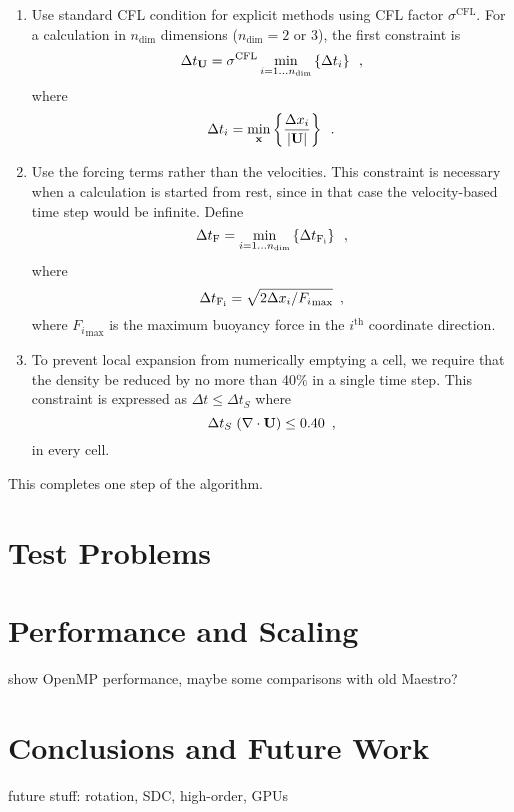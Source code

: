 \documentclass{aastex62}
\newcommand{\Ub}{{\bf{U}}}
\newcommand{\dt}{\Delta t}
\begin{document}
\begin{description}
\begin{enumerate}
\renewcommand{\theenumi}{{\bf \Alph{enumi}}}
\item Use standard CFL condition for explicit methods using CFL factor $\sigma^{\mathrm{CFL}}$.
  For a calculation in $n_{\mathrm{dim}}$ dimensions ($n_{\mathrm{dim}}=2$ or 3),
  the first constraint is
\begin{equation}
\dt_{\Ub} = \sigma^\mathrm{CFL}  \min_{i=1\ldots n_\mathrm{dim}} \left \{ \dt_i \right \}\enskip,
\end{equation}
  where
\begin{equation}
\dt_i = \min_{\bf x}  \left \{ \frac{\Delta x_i}{\left | \Ub \right |}  \right \}\enskip.
\end{equation}

\item Use the forcing terms rather than the velocities.
  This constraint is necessary when a calculation is started from rest,
  since in that case the velocity-based time step would be infinite. Define
\begin{equation}
\dt_{\rm F} = \min_{i=1\ldots n_\mathrm{dim}} \left \{ \dt_{\rm F_i} \right \}\enskip,
\end{equation}
where
\begin{equation}
\dt_{\rm F_i} = \sqrt{2 \Delta x_i / {F_i}_\mathrm{max}}\enskip,
\end{equation}
where ${F_i}_\mathrm{max}$ is the maximum buoyancy force in the
$i^\mathrm{th}$ coordinate direction.

\item To prevent local expansion from numerically emptying a cell,
  we require that the density be reduced by no more than 40\% in a single time step.
  This constraint is expressed as $\dt \leq \dt_S$ where
\begin{equation}
 \Delta t_S \; (\nabla \cdot \Ub)  \leq 0.40 \enskip ,
\end{equation}
  in every cell.

\end{enumerate}

\end{description}

\noindent This completes one step of the algorithm.


\section{Test Problems}


\section{Performance and Scaling}

show OpenMP performance, maybe some comparisons with old Maestro?

\section{Conclusions and Future Work}

future stuff: rotation, SDC, high-order, GPUs

\acknowledgements




\end{document}
